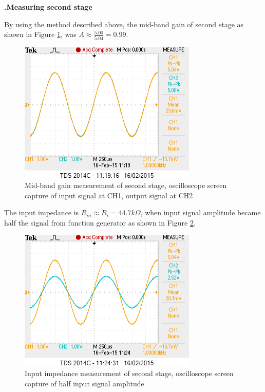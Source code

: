 \documentclass[a4paper,notitlepage,10pt]{report}
\newcommand{\tab}{\hspace{0.75cm}}
\newcommand{\fontSubHeading}{\fontsize{10pt}{11pt}\selectfont}
\newcounter{sections}
\newcounter{subsections}[sections]
\begin{document}
\begin{multicols}{2}
\fontSubHeading
{}
\textbf{.\tab Measuring second stage}

By using the method described above, the mid-band gain of second stage as shown in Figure \ref{fig:lab_cc_gain}, was $A \approx \frac{5.00}{5.04} = 0.99$.
\parskip=0pt

\begin{figure}[H]
	\centering
	\includegraphics[width=0.85\columnwidth]{labccgain}
	\caption{Mid-band gain measurement of second stage, oscilloscope screen capture of input signal at CH1, output signal at CH2}
	\label{fig:lab_cc_gain}
\end{figure}
\parskip=6pt

The input impedance is $R_{in} \approx R_i = 44.7k\Omega$, when input signal amplitude became half the signal from function generator as shown in Figure \ref{fig:lab_cc_rin}.
\parskip=0pt

\begin{figure}[H]
	\centering
	\includegraphics[width=0.85\columnwidth]{labccrin}
	\caption{Input impedance measurement of second stage, oscilloscope screen capture of half input signal amplitude}
	\label{fig:lab_cc_rin}
\end{figure}
\parskip=6pt


\end{multicols}
\end{document}
